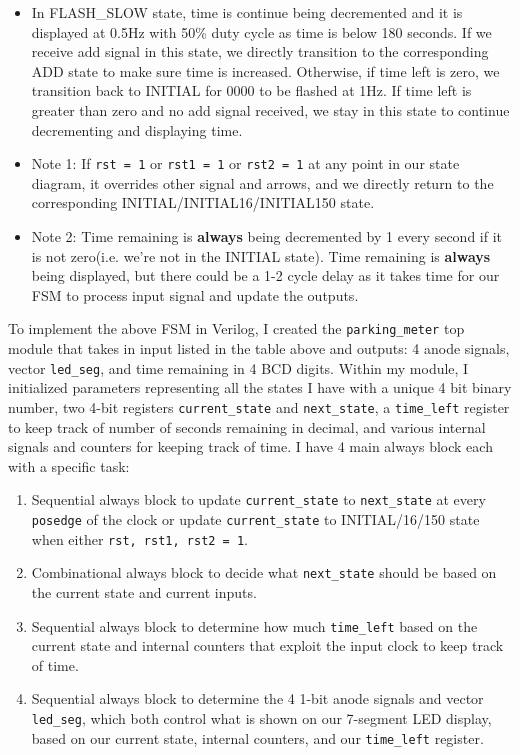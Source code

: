 \documentclass{article}
\begin{document}
\begin{itemize}
    \item In FLASH\_SLOW state, time is continue being decremented and it is displayed at 0.5Hz with 50\% duty cycle as time is below 180 seconds. If we receive add signal in this state, we directly transition to the corresponding ADD state to make sure time is increased. Otherwise, if time left is zero, we transition back to INITIAL for 0000 to be flashed at 1Hz. If time left is greater than zero and no add signal received, we stay in this state to continue decrementing and displaying time. 
    \item Note 1: If \texttt{rst = 1} or \texttt{rst1 = 1} or \texttt{rst2 = 1}  at any point in our state diagram, it overrides other signal and arrows, and we directly return to the corresponding INITIAL/INITIAL16/INITIAL150 state.
    \item Note 2: Time remaining is \textbf{always} being decremented by 1 every second if it is not zero(i.e. we're not in the INITIAL state). Time remaining is \textbf{always} being displayed, but there could be a 1-2 cycle delay as it takes time for our FSM to process input signal and update the outputs. 
\end{itemize}
To implement the above FSM in Verilog, I created the \texttt{parking\_meter} top module that takes in input listed in the table above and outputs: 4 anode signals, vector \texttt{led\_seg}, and time remaining in 4 BCD digits. Within my module, I initialized parameters representing all the states I have with a unique 4 bit binary number, two 4-bit registers \texttt{current\_state} and \texttt{next\_state}, a \texttt{time\_left} register to keep track of number of seconds remaining in decimal, and various internal signals and counters for keeping track of time. I have 4 main always block each with a specific task:
\begin{enumerate}
    \item Sequential always block to update \texttt{current\_state} to \texttt{next\_state} at every \texttt{posedge} of the clock or update \texttt{current\_state} to INITIAL/16/150 state when either \texttt{rst, rst1, rst2 = 1}.
    \item Combinational always block to decide what \texttt{next\_state} should be based on the current state and current inputs.
    \item Sequential always block to determine how much \texttt{time\_left} based on the current state and internal counters that exploit the input clock to keep track of time.
    \item Sequential always block to determine the 4 1-bit anode signals and vector \texttt{led\_seg}, which both control what is shown on our 7-segment LED display, based on our current state, internal counters, and our \texttt{time\_left} register.
\end{enumerate}
\end{document}
